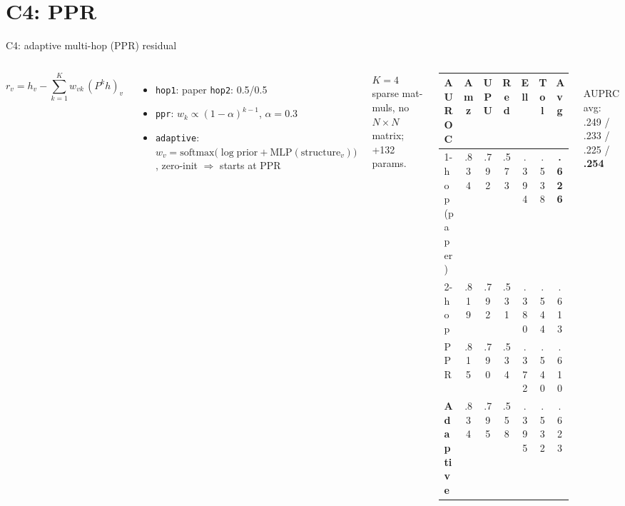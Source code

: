 \documentclass[aspectratio=169,11pt]{beamer}
\begin{document}
\section{C4: PPR}
\begin{frame}{C4: adaptive multi-hop (PPR) residual}
\begin{columns}[T]
\[
r_v=h_v-\sum_{k=1}^{K}w_{vk}\,(P^{k}h)_v
\]
\small
\begin{itemize}
\item \texttt{hop1}: paper \quad \texttt{hop2}: 0.5/0.5
\item \texttt{ppr}: $w_k\propto(1-\alpha)^{k-1}$, $\alpha=0.3$
\item \texttt{adaptive}: $w_v=\mathrm{softmax}\big(\log\text{prior}+\mathrm{MLP}(\text{structure}_v)\big)$, zero-init $\Rightarrow$ starts at PPR
\end{itemize}
\footnotesize $K{=}4$ sparse mat-muls, no $N\!\times\!N$ matrix; +132 params.
\footnotesize
\begin{tabular}{lcccccc}
\toprule
AUROC & Amz & UPU & Red & Ell & Tol & \textbf{Avg}\\ \midrule
1-hop (paper) & .834 & .792 & .573 & .394 & .538 & \textbf{.626}\\
2-hop & .819 & .792 & .531 & .380 & .544 & .613\\
PPR & .815 & .790 & .534 & .372 & .540 & .610\\
\textbf{Adaptive} & .834 & .795 & .558 & .395 & .532 & .623\\ \bottomrule
\end{tabular}\\[4pt]
AUPRC avg: .249 / .233 / .225 / \textbf{.254}
\end{columns}
\end{frame}
\end{document}
